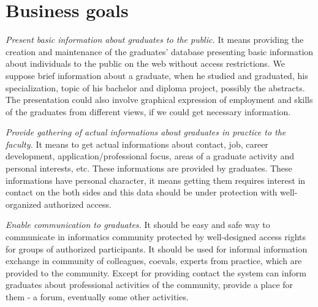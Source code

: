 \documentclass{iitsrc}[2006/14/02]
\begin{document}

\section{Business goals}

{\em Present basic information about graduates to the public.}
It means providing the creation and maintenance of the graduates’ database presenting basic information about individuals to the public on the web without access restrictions. We suppose brief information about a graduate, when he studied and graduated, his specialization, topic of his bachelor and diploma project, possibly the abstracts. The presentation could also involve graphical expression of employment and skills of the graduates from different views, if we could get necessary information.

{\em Provide gathering of actual informations about graduates in practice to the faculty.} 
It means to get actual informations about contact, job, career development, application/professional focus, areas of a graduate activity and personal interests, etc. These informations are provided by graduates. These informations have personal character, it means getting them requires interest in contact on the both sides and this data should be under protection with well-organized authorized access.

{\em Enable communication to graduates.}
It should be easy and safe way to communicate in informatics community protected by well-designed access rights for groups of authorized participants. It should be used for informal information exchange in community of colleagues, coevals, experts from practice, which are provided to the community. Except for providing contact the system can inform graduates about professional activities of the community, provide a place for them - a forum, eventually some other activities.
\end{document}
